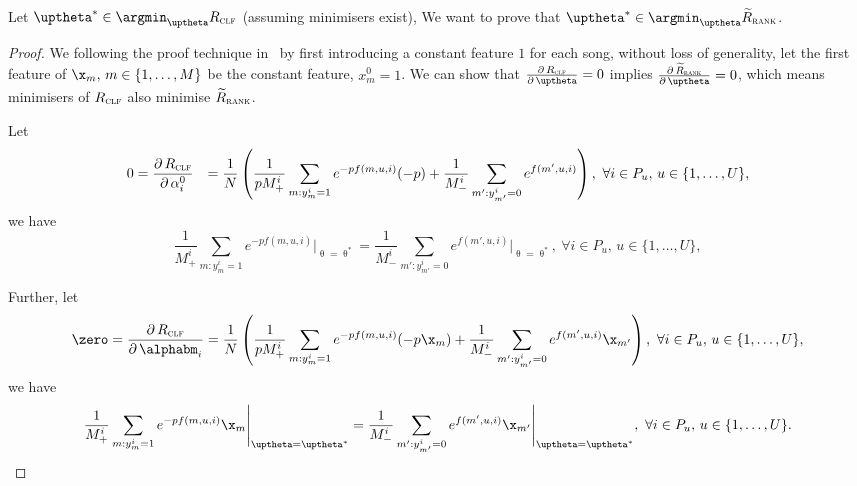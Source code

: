 Let $\uptheta^* \in \argmin_{\uptheta} R_\textsc{clf}$ (assuming minimisers exist),
We want to prove that $\uptheta^* \in \argmin_{\uptheta} \widetilde R_\textsc{rank}$.

\begin{proof}
We following the proof technique in~\cite{ertekin2011equivalence}
by first introducing a constant feature $1$ for each song,
without loss of generality, let the first feature of $\x_m, \, m \in \{1,\dots,M\}$ be the constant feature, \ie $x_m^0 = 1$.
We can show that
$\frac{\partial \, R_\textsc{clf}} {\partial \, \uptheta} = 0$ implies
$\frac{\partial \, \widetilde R_\textsc{rank}} {\partial \, \uptheta} = 0$,
which means minimisers of $R_\textsc{clf}$ also minimise $\widetilde R_\textsc{rank}$.

Let 
\begin{equation*}
\begin{aligned}
0 
&= \frac{\partial \, R_\textsc{clf}} {\partial \, \alpha_i^0}
&= \frac{1}{N} \left( 
   \frac{1}{p M_+^i} \sum_{m: y_m^i = 1} e^{-p f(m, u, i)} (-p)
   + \frac{1}{M_-^i} \sum_{m': y_{m'}^i = 0} e^{f(m', u, i)} \right),
\ \forall i \in P_u, \, u \in \{1,\dots,U\},
\end{aligned}
\end{equation*}
we have
\begin{equation}
\label{eq:eq1}
\frac{1}{M_+^i} \sum_{m: y_m^i = 1} e^{-p f(m, u, i)} \Bigg|_{\uptheta = \uptheta^*}
= \frac{1}{M_-^i} \sum_{m': y_{m'}^i = 0} e^{f(m', u, i)} \Bigg|_{\uptheta = \uptheta^*}, 
\ \forall i \in P_u, \, u \in \{1,\dots,U\},
\end{equation}

Further, let
\begin{equation*}
\zero 
= \frac{\partial \, R_\textsc{clf}} {\partial \, \alphabm_i} 
= \frac{1}{N} \left( 
   \frac{1}{p M_+^i} \sum_{m: y_m^i = 1} e^{-p f(m, u, i)} (-p \x_m)
   + \frac{1}{M_-^i} \sum_{m': y_{m'}^i = 0} e^{f(m', u, i)} \x_{m'} \right),
\ \forall i \in P_u, \, u \in \{1,\dots,U\},
\end{equation*}
we have
\begin{equation}
\label{eq:eq2}
\frac{1}{M_+^i} \sum_{m: y_m^i = 1} e^{-p f(m, u, i)} \x_m \Bigg|_{\uptheta = \uptheta^*}
= \frac{1}{M_-^i} \sum_{m': y_{m'}^i = 0} e^{f(m', u, i)} \x_{m'} \Bigg|_{\uptheta = \uptheta^*},
\ \forall i \in P_u, \, u \in \{1,\dots,U\}.
\end{equation}


\end{proof}
